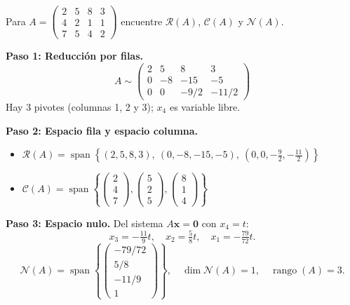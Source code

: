 \begin{example}
Para $A = \begin{pmatrix} 2 & 5 & 8 & 3 \\ 4 & 2 & 1 & 1 \\ 7 & 5 & 4 & 2 \end{pmatrix}$ encuentre $\mathcal{R}(A)$, $\mathcal{C}(A)$ y $\mathcal{N}(A)$.
\begin{myproof}
\textbf{Paso 1: Reducción por filas.}
$$A \sim \begin{pmatrix} 2 & 5 & 8 & 3 \\ 0 & -8 & -15 & -5 \\ 0 & 0 & -9/2 & -11/2 \end{pmatrix}$$
Hay 3 pivotes (columnas 1, 2 y 3); $x_4$ es variable libre.

\textbf{Paso 2: Espacio fila y espacio columna.}
\begin{itemize}
    \item $\mathcal{R}(A) = \operatorname{span}\left\{ (2,5,8,3),\ (0,-8,-15,-5),\ (0,0,-\tfrac{9}{2},-\tfrac{11}{2}) \right\}$
    \item $\mathcal{C}(A) = \operatorname{span}\left\{ \begin{pmatrix} 2 \\ 4 \\ 7 \end{pmatrix}, \begin{pmatrix} 5 \\ 2 \\ 5 \end{pmatrix}, \begin{pmatrix} 8 \\ 1 \\ 4 \end{pmatrix} \right\}$
\end{itemize}

\textbf{Paso 3: Espacio nulo.} Del sistema $A\mathbf{x}=\mathbf{0}$ con $x_4=t$:
$$x_3 = -\tfrac{11}{9}t,\quad x_2 = \tfrac{5}{8}t,\quad x_1 = -\tfrac{79}{72}t.$$
$$\boxed{\mathcal{N}(A) = \operatorname{span}\!\left\{ \begin{pmatrix}-79/72\\5/8\\-11/9\\1\end{pmatrix} \right\},\quad \dim\mathcal{N}(A)=1,\quad \operatorname{rango}(A)=3.}$$
\end{myproof}
\end{example}

